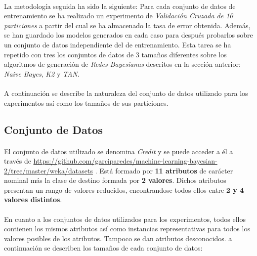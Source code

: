 \documentclass{article}
\begin{document}
		\paragraph{}
		La metodología seguida ha sido la siguiente: Para cada conjunto de datos de entrenamiento se ha realizado un experimento de \emph{Validación Cruzada de 10 particiones} a partir del cual se ha almacenado la tasa de error obtenida. Además, se han guardado los modelos generados en cada caso para después probarlos sobre un conjunto de datos independiente del de entrenamiento. Esta tarea se ha repetido con tres los conjuntos de datos de 3 tamaños diferentes sobre los algoritmos de generación de \emph{Redes Bayesianas} descritos en la sección anterior: \emph{Naive Bayes}, \emph{K2} y \emph{TAN}.

		\paragraph{}
		A continuación se describe la naturaleza del conjunto de datos utilizado para los experimentos así como los tamaños de sus particiones.

		\subsection{Conjunto de Datos}
		\label{sec:data_set}

			\paragraph{}
			El conjunto de datos utilizado se denomina \emph{Credit} y se puede acceder a él a través de \url{https://github.com/garciparedes/machine-learning-bayesian-2/tree/master/weka/datasets} \cite{garciparedes:machine-learning-bayesian-2}. Está formado por \textbf{11 atributos} de carácter nominal más la clase de destino formada por \textbf{2 valores}. Dichos atributos presentan un rango de valores reducidos, encontrandose todos ellos entre \textbf{2 y 4 valores distintos}.

			\paragraph{}
			En cuanto a los conjuntos de datos utilizados para los experimentos, todos ellos contienen los mismos atributos así como instancias representativas para todos los valores posibles de los atributos. Tampoco se dan atributos desconocidos. a continuación se describen los tamaños de cada conjunto de datos:
\end{document}
